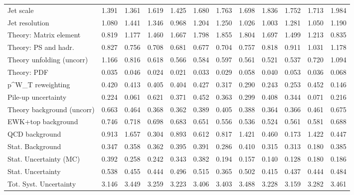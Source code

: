 \begin{tabular}{l|p{0.6cm}p{0.6cm}p{0.6cm}p{0.6cm}p{0.6cm}p{0.6cm}p{0.6cm}p{0.6cm}p{0.6cm}p{0.6cm}p{0.6cm}}
Jet scale                                & 1.391 & 1.361 & 1.619 & 1.425 & 1.680 & 1.763 & 1.698 & 1.836 & 1.752 & 1.713 & 1.984 \\
Jet resolution                           & 1.080 & 1.441 & 1.346 & 0.968 & 1.204 & 1.250 & 1.026 & 1.003 & 1.281 & 1.050 & 1.190 \\
Theory: Matrix element                   & 0.819 & 1.177 & 1.460 & 1.667 & 1.798 & 1.855 & 1.804 & 1.697 & 1.499 & 1.213 & 0.835 \\
Theory: PS and hadr.                     & 0.827 & 0.756 & 0.708 & 0.681 & 0.677 & 0.704 & 0.757 & 0.818 & 0.911 & 1.031 & 1.178 \\
Theory unfolding (uncorr)                & 1.166 & 0.816 & 0.618 & 0.566 & 0.584 & 0.597 & 0.561 & 0.521 & 0.537 & 0.720 & 1.094 \\
Theory: PDF                              & 0.035 & 0.046 & 0.024 & 0.021 & 0.033 & 0.029 & 0.058 & 0.040 & 0.053 & 0.036 & 0.068 \\
p^{W}_{T} reweighting                    & 0.420 & 0.413 & 0.405 & 0.404 & 0.427 & 0.317 & 0.290 & 0.243 & 0.253 & 0.452 & 0.146 \\
Pile-up uncertainty                      & 0.224 & 0.061 & 0.621 & 0.371 & 0.452 & 0.363 & 0.299 & 0.408 & 0.344 & 0.071 & 0.216 \\
Theory background (uncorr)               & 0.663 & 0.464 & 0.368 & 0.362 & 0.389 & 0.405 & 0.388 & 0.364 & 0.366 & 0.461 & 0.675 \\
EWK+top background                       & 0.746 & 0.718 & 0.698 & 0.683 & 0.651 & 0.556 & 0.536 & 0.524 & 0.561 & 0.581 & 0.688 \\
QCD background                           & 0.913 & 1.657 & 0.304 & 0.893 & 0.612 & 0.817 & 1.421 & 0.460 & 0.173 & 1.422 & 0.447 \\
Stat. Background                         & 0.347 & 0.358 & 0.362 & 0.395 & 0.391 & 0.286 & 0.410 & 0.315 & 0.313 & 0.180 & 0.385 \\
Stat. Uncertainty (MC)                   & 0.392 & 0.258 & 0.242 & 0.343 & 0.382 & 0.194 & 0.157 & 0.140 & 0.128 & 0.180 & 0.186 \\
\hline
Stat. Uncertainty                        & 0.538 & 0.455 & 0.444 & 0.496 & 0.515 & 0.365 & 0.502 & 0.415 & 0.437 & 0.444 & 0.484 \\
\hline
Tot. Syst. Uncertainty                   & 3.146 & 3.449 & 3.259 & 3.223 & 3.406 & 3.403 & 3.488 & 3.228 & 3.159 & 3.282 & 3.461 \\
\hline
\end{tabular}
